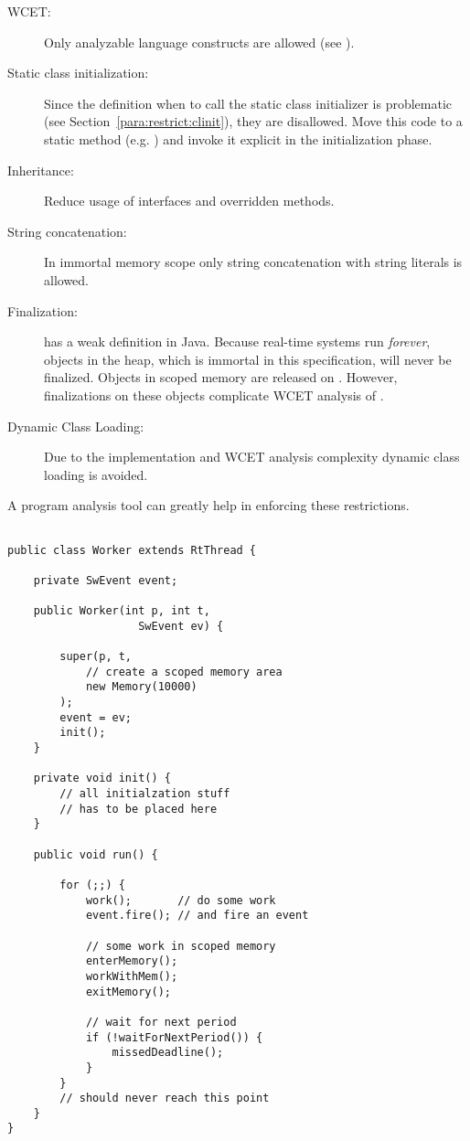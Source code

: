 \begin{description}
    \item[WCET:] Only analyzable language constructs are allowed (see \cite{84850}).

    \item[Static class initialization:] Since the definition when
to call the static class initializer is problematic (see
Section~\ref{para:restrict:clinit}), they are disallowed. Move this
code to a static method (e.g. ) and invoke it explicit
in the initialization phase.

    \item[Inheritance:] Reduce usage of interfaces and overridden methods.

    \item[String concatenation:] In immortal memory scope only string concatenation with string
literals is allowed.

    \item[Finalization:]  has a weak definition
in Java. Because real-time systems run \emph{forever}, objects in
the heap, which is immortal in this specification, will never be
finalized. Objects in scoped memory are released on
. However, finalizations on these objects
complicate WCET analysis of .

    \item[Dynamic Class Loading:] Due to the implementation and WCET analysis
complexity dynamic class loading is avoided.

\end{description}
%
A program analysis tool can greatly help in enforcing these
restrictions.


\begin{lstlisting}[float,caption={A periodic real-time thread},
label=lst:arch:rt:profile:example]

public class Worker extends RtThread {

    private SwEvent event;

    public Worker(int p, int t,
                    SwEvent ev) {

        super(p, t,
            // create a scoped memory area
            new Memory(10000)
        );
        event = ev;
        init();
    }

    private void init() {
        // all initialzation stuff
        // has to be placed here
    }

    public void run() {

        for (;;) {
            work();       // do some work
            event.fire(); // and fire an event

            // some work in scoped memory
            enterMemory();
            workWithMem();
            exitMemory();

            // wait for next period
            if (!waitForNextPeriod()) {
                missedDeadline();
            }
        }
        // should never reach this point
    }
}
\end{lstlisting}

